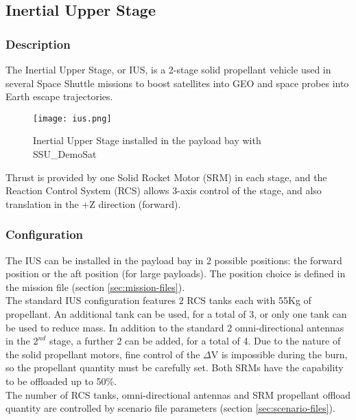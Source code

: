\documentclass[Space_Shuttle_Ultra_Manual.tex]{subfiles}
\begin{document}
\subsection{Inertial Upper Stage}
\begin{multicols*}{2}
\renewcommand{\cfttoctitlefont}{\bf}
\localtableofcontents
\subsubsection{Description}
\noindent
The Inertial Upper Stage, or IUS, is a 2-stage solid propellant vehicle used in several Space Shuttle missions to boost satellites into GEO and space probes into Earth escape trajectories.
\\
\begin{figure}[H]
	\centering
	\captionsetup{justification=centering}
  \texttt{[image: ius.png]}
  \caption{Inertial Upper Stage installed in the payload bay with SSU\_DemoSat}
  \label{fig:ius}
\end{figure}
\noindent
Thrust is provided by one Solid Rocket Motor (SRM) in each stage, and the Reaction Control System (RCS) allows 3-axis control of the stage, and also translation in the +Z direction (forward).\\

\subsubsection{Configuration}
\noindent
The IUS can be installed in the payload bay in 2 possible positions: the forward position or the aft position (for large payloads). The position choice is defined in the mission file (section \ref{sec:mission-files}).\\
The standard IUS configuration features 2 RCS tanks each with 55Kg of propellant. An additional tank can be used, for a total of 3, or only one tank can be used to reduce mass. In addition to the standard 2 omni-directional antennas in the $2^{nd}$ stage, a further 2 can be added, for a total of 4. Due to the nature of the solid propellant motors, fine control of the $\Delta$V is impossible during the burn, so the propellant quantity must be carefully set. Both SRMs have the capability to be offloaded up to 50\%.\\
The number of RCS tanks, omni-directional antennas and SRM propellant offload quantity are controlled by scenario file parameters (section \ref{sec:scenario-files}).


\end{multicols*}
\end{document}

